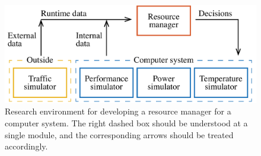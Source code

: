 \begin{figure}[b]
  \centering
  \includegraphics[width=1.0\columnwidth]{include/assets/figures/development.pdf}
  \caption{
    Research environment for developing a resource manager for a computer
    system. The right dashed box should be understood at a single module, and
    the corresponding arrows should be treated accordingly.
  }
\end{figure}

